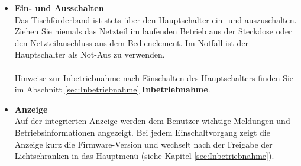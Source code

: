 \begin{itemize}
	\item \textbf{Ein- und Ausschalten} \\
	Das Tischförderband ist stets über den Hauptschalter ein- und auszuschalten. Ziehen Sie niemals das Netzteil im laufenden Betrieb aus der Steckdose oder den Netzteilanschluss aus dem Bedienelement.
	Im Notfall ist der Hauptschalter als Not-Aus zu verwenden.\\
	\\
	Hinweise zur Inbetriebnahme nach Einschalten des Hauptschalters finden Sie im Abschnitt \ref{sec:Inbetriebnahme}  \textbf{Inbetriebnahme}.
	
	\item \textbf{Anzeige} \\
	Auf der integrierten Anzeige werden dem Benutzer wichtige Meldungen und Betriebsinformationen angezeigt. 
	Bei jedem Einschaltvorgang zeigt die Anzeige kurz die Firmware-Version und wechselt nach der Freigabe der Lichtschranken in das Hauptmenü (siehe Kapitel \ref{sec:Inbetriebnahme}). 
	
	
	\begin{figure}[!ht]
		\begin{center}
\end{center}
\end{figure}
\end{itemize}
